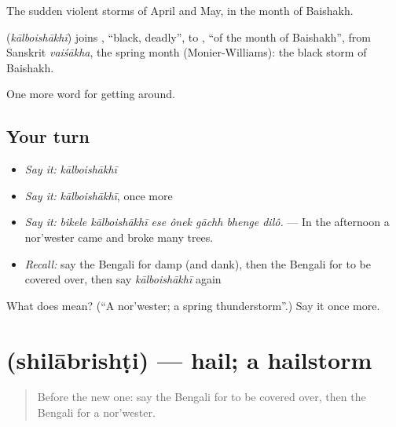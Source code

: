 The sudden violent storms of April and May, in the month of Baishakh.

\begin{cousinweb}
\textbf{} (\emph{kālboishākhī}) joins , \textquotedblleft{}black, deadly\textquotedblright{}, to , \textquotedblleft{}of the month of Baishakh\textquotedblright{}, from Sanskrit \emph{vaiśākha}, the spring month (Monier-Williams): the black storm of Baishakh.
\end{cousinweb}

\begin{grammarlens}[title={What you've built}]
One more word for getting around.
\end{grammarlens}

\subsection*{Your turn}
\begin{itemize}
\raggedright
  \item \emph{Say it:} \emph{kālboishākhī}
  \item \emph{Say it:} \emph{kālboishākhī}, once more
  \item \emph{Say it:} \emph{bikele kālboishākhī ese ônek gāchh bhenge dilô.} — In the afternoon a nor'wester came and broke many trees.
  \item \emph{Recall:} say the Bengali for damp (and dank), then the Bengali for to be covered over, then say \emph{kālboishākhī} again
\end{itemize}

\begin{tcolorbox}[breakable,colback=teal!4,colframe=teal!35!black,title={Before you move on}]
What does  mean? (\textquotedblleft{}A nor'wester; a spring thunderstorm\textquotedblright{}.) Say it once more.
\end{tcolorbox}
\section[\texorpdfstring{\bn{শিলাবৃষ্টি} (shilābrishṭi)}{শিলাবৃষ্টি (shilābrishṭi)}]{ (shilābrishṭi) — hail; a hailstorm}

\label{lesson:BN-C429-shilabrishti}



\begin{quote}
Before the new one: say the Bengali for to be covered over, then the Bengali for a nor'wester.
\end{quote}

